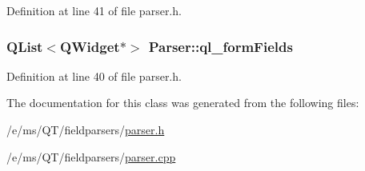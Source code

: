Definition at line 41 of file parser.h.

\hypertarget{classParser_a457a6f19e0594ed8a745c8a00be32c4b}{
\subsubsection[{ql\_\-formFields}]{\setlength{\rightskip}{0pt plus 5cm}QList$<$QWidget$\ast$$>$ {\bf Parser::ql\_\-formFields}}}
\label{classParser_a457a6f19e0594ed8a745c8a00be32c4b}


Definition at line 40 of file parser.h.



The documentation for this class was generated from the following files:\begin{DoxyCompactItemize}
\item 
/e/ms/QT/fieldparsers/\hyperlink{parser_8h}{parser.h}\item 
/e/ms/QT/fieldparsers/\hyperlink{parser_8cpp}{parser.cpp}\end{DoxyCompactItemize}
